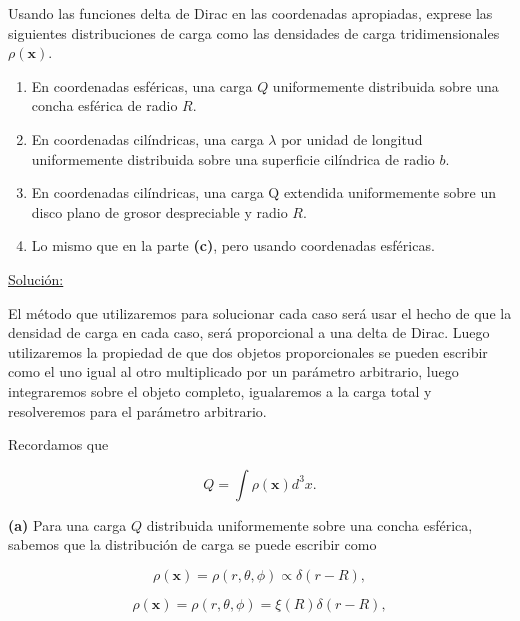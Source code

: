 \documentclass[a4paper,11pt]{article}
\numberwithin{equation}{section}
\begin{document}
Usando las funciones delta de Dirac en las coordenadas apropiadas, exprese las 
siguientes distribuciones de carga como las densidades de carga tridimensionales 
$\rho(\mathbf{x}).$

\begin{enumerate}[label=\textbf{(\alph*)}]
 \item En coordenadas esféricas, una carga $Q$ uniformemente distribuida sobre 
 una concha esférica de radio $R$.
 \item En coordenadas cilíndricas, una carga $\lambda$ por unidad de longitud 
 uniformemente distribuida sobre una superficie cilíndrica de radio $b$.
 \item En coordenadas cilíndricas, una carga Q extendida uniformemente sobre 
 un disco plano de grosor despreciable y radio $R$.
 \item Lo mismo que en la parte \textbf{(c)}, pero usando coordenadas esféricas.
\end{enumerate}

\vspace{.3cm}

\underline{Solución:} \vspace{.3cm}

El método que utilizaremos para solucionar cada caso será usar el hecho de que 
la densidad de carga en cada caso, será proporcional a una delta de Dirac. Luego 
utilizaremos la propiedad de que dos objetos proporcionales se pueden escribir 
como el uno igual al otro multiplicado por un parámetro arbitrario, luego integraremos sobre 
el objeto completo, igualaremos a la carga total y resolveremos para el parámetro 
arbitrario.

\vspace{.3cm}

Recordamos que 

\begin{equation}
 Q = \int \rho(\mathbf{x})d^3x.
\end{equation}

\textbf{(a)} Para una carga $Q$ distribuida uniformemente sobre una concha esférica, 
sabemos que la distribución de carga se puede escribir como 

\begin{equation}
 \rho(\mathbf{x}) = \rho(r,\theta,\phi) \propto \delta(r-R),
\end{equation}

\begin{equation}
 \rho(\mathbf{x}) =  \rho(r,\theta,\phi) = \xi(R)\delta(r-R),
\end{equation}
\end{document}

